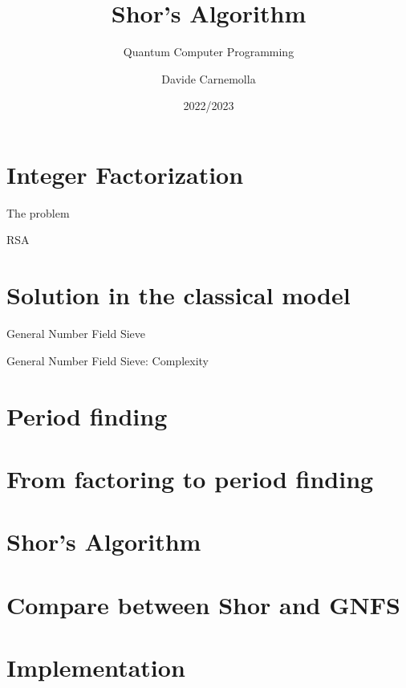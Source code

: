 \documentclass{beamer}
\title{Shor's Algorithm}
\subtitle{Quantum Computer Programming}
\author{Davide Carnemolla}
\institute{Department of Mathematics and \\ Computer Science \\ \\ University of Catania}
\date{2022/2023}
\begin{document}
    \begin{frame}
        \maketitle
    \end{frame}
    
    \section{Integer Factorization}

    \begin{frame}{The problem}
        
    \end{frame}

    \begin{frame}{RSA}

    \end{frame}

    \section{Solution in the classical model}

    \begin{frame}{General Number Field Sieve}
        
    \end{frame}

    \begin{frame}{General Number Field Sieve: Complexity}
        
    \end{frame}

    \section{Period finding}

    \section{From factoring to period finding}

    \section{Shor's Algorithm}

    \section{Compare between Shor and GNFS}

    \section{Implementation}
    
    
\end{document}
